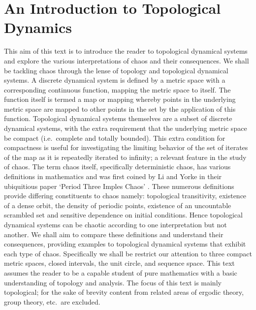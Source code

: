 \documentclass[11pt,a4paper,oneside]{memoir}
\theoremstyle{plain}
\theoremstyle{definition}
\begin{document}
\newpage
\tableofcontents

\chapter{An Introduction to Topological Dynamics}
This aim of this text is to introduce the reader to topological dynamical systems and explore the various interpretations of chaos and their consequences. We shall be tackling chaos through the lense of topology and topological dynamical systems. A discrete dynamical system is defined by a metric space with a corresponding continuous function, mapping the metric space to itself. The function itself is termed a map or mapping whereby points in the underlying metric space are mapped to other points in the set by the application of this function. Topological dynamical systems themselves are a subset of discrete dynamical systems, with the extra requirement that the underlying metric space be compact (i.e.\ complete and totally bounded). This extra condition for compactness is useful for investigating the limiting behavior of the set of iterates of the map as it is repeatedly iterated to infinity; a relevant feature in the study of chaos. The term chaos itself, specifically deterministic chaos, has various definitions in mathematics and was first coined by Li and Yorke in their ubiquitious paper `Period Three Imples Chaos' \cite{li-yorke}. These numerous definitions provide differing constituents to chaos namely: topological transitivity, existence of a dense orbit, the density of periodic points, existence of an uncountable scrambled set and sensitive dependence on initial conditions. Hence topological dynamical systems can be chaotic according to one interpretation but not another. We shall aim to compare these definitions and understand their consequences, providing examples to topological dynamical systems that exhibit each type of chaos. Specifically we shall be restrict our attention to three compact metric spaces, closed intervals, the unit circle, and sequence space. This text assumes the reader to be a capable student of pure mathematics with a basic understanding of topology and analysis. The focus of this text is mainly topological; for the sake of brevity content from related areas of ergodic theory, group theory, etc.\ are excluded.
\end{document}

